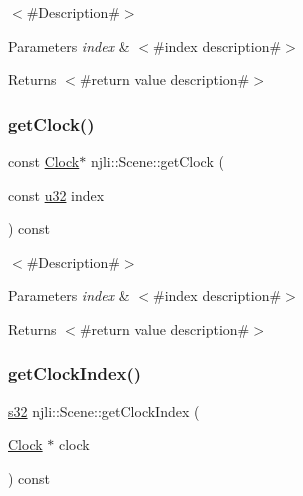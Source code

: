 $<$\#\+Description\#$>$


\begin{DoxyParams}{Parameters}
{\em index} & $<$\#index description\#$>$\\
\hline
\end{DoxyParams}
\begin{DoxyReturn}{Returns}
$<$\#return value description\#$>$ 
\end{DoxyReturn}
\mbox{\label{classnjli_1_1_scene_ae03ad36c1fa1f906ad9affb26f03e519}} 
\subsubsection{\texorpdfstring{get\+Clock()}{getClock()}\hspace{0.1cm}{\footnotesize\ttfamily [2/2]}}
{\footnotesize\ttfamily const \mbox{\hyperlink{classnjli_1_1_clock}{Clock}}$\ast$ njli\+::\+Scene\+::get\+Clock (\begin{DoxyParamCaption}\item[{const \mbox{\hyperlink{_util_8h_a10e94b422ef0c20dcdec20d31a1f5049}{u32}}}]{index }\end{DoxyParamCaption}) const}

$<$\#\+Description\#$>$


\begin{DoxyParams}{Parameters}
{\em index} & $<$\#index description\#$>$\\
\hline
\end{DoxyParams}
\begin{DoxyReturn}{Returns}
$<$\#return value description\#$>$ 
\end{DoxyReturn}
\mbox{\label{classnjli_1_1_scene_a7988c5db188ad35b0a4d474ea493e611}} 
\subsubsection{\texorpdfstring{get\+Clock\+Index()}{getClockIndex()}}
{\footnotesize\ttfamily \mbox{\hyperlink{_util_8h_aa62c75d314a0d1f37f79c4b73b2292e2}{s32}} njli\+::\+Scene\+::get\+Clock\+Index (\begin{DoxyParamCaption}\item[{\mbox{\hyperlink{classnjli_1_1_clock}{Clock}} $\ast$}]{clock }\end{DoxyParamCaption}) const}

